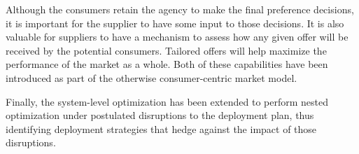 Although the consumers retain the agency to make the final preference
decisions, it is important for the supplier to have some input to those
decisions.  It is also valuable for suppliers to have a mechanism to assess
how any given offer will be received by the potential consumers.  Tailored
offers will help maximize the performance of the market as a whole.  Both of
these capabilities have been introduced as part of the otherwise
consumer-centric market model.

Finally, the system-level optimization has been extended to perform nested
optimization under postulated disruptions to the deployment plan, thus
identifying deployment strategies that hedge against the impact of those
disruptions.


